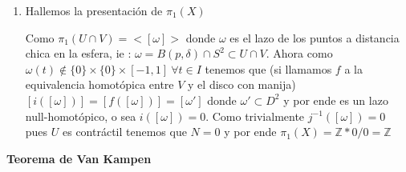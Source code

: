 \documentclass[11pt]{article}
\newenvironment{proof}[1][Demostraci\'on]{\begin{trivlist}
\item[\hskip \labelsep {\bfseries #1}]}{\end{trivlist}}
\newcommand{\Z}{\mathbb{Z}}
\begin{document}
\begin{proof}
\begin{enumerate}
\item {Hallemos la presentaci\'on de $\pi_1(X)$} 

Como $\pi_1(U \cap V) = <[\omega]>$ donde $\omega$ es el lazo de los puntos a distancia chica en la esfera, ie : $\omega = B(p,\delta) \cap S^2 \subset U \cap V$. Ahora como $\omega(t) \not \in \{0\}\times \{0\}\times [-1,1]  \ \forall t \in I$ tenemos que (si llamamos $f$ a la equivalencia homot\'opica entre $V$ y el disco con manija) $[i([\omega])] = [f([\omega])]=[\omega']$ donde $\omega' \subset D^2$ y por ende es un lazo null-homot\'opico, o sea $i([\omega])=0$. Como trivialmente $j^{-1}([\omega])=0$ pues $U$ es contr\'actil tenemos que $N=0$ y por ende $\pi_1(X)=\Z * 0 / 0 = \Z$

\end{enumerate}

\end{proof}

\bigskip

\begin{center}

\textbf{Teorema de Van Kampen}

\end{center}
\end{document}
